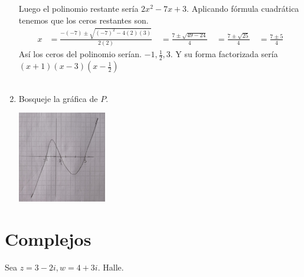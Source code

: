 \documentclass{report}
\begin{document}
\begin{enumerate}
                Luego el polinomio restante sería $2x^2 - 7x + 3$. Aplicando fórmula cuadrática tenemos que los ceros restantes son.
                \begin{align*}
                    x &= \frac{-(-7) \pm \sqrt{(-7)^2 - 4(2)(3)}}{2(2)} \
                    &= \frac{7 \pm \sqrt{49 - 24}}{4} \
                    &= \frac{7 \pm \sqrt{25}}{4} \
                    &= \frac{7 \pm 5}{4}
                \end{align*}
                Así los ceros del polinomio serían. $-1,\frac{1}{2},3$. Y su forma factorizada sería $(x +1 )(x-3)(x - \frac{1}{2})$\\\\
            \item Bosqueje la gráfica de $P$.\\
                \begin{center}
                    \includegraphics[height=4cm]{images/foto1.jpg}
                \end{center}
        \end{enumerate}
    \section*{Complejos}
        Sea $z=3-2i, w=4 +3i$. Halle.
\end{document}
